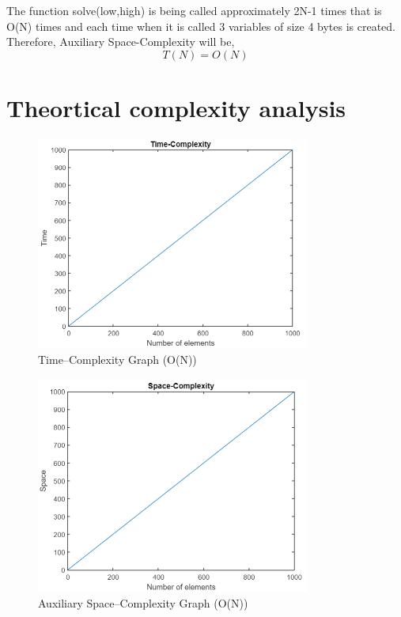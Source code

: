 \documentclass[conference]{IEEEtran}
\begin{document}
The function solve(low,high) is being called approximately 2N-1 times that is O(N) times and each time when it is called 3 variables of size 4 bytes is created.
Therefore, Auxiliary Space-Complexity will be,
\begin{equation}
    T(N) = O(N)
\end{equation}
\section{Theortical complexity analysis}
\begin{figure}[htbp]
\centerline{\includegraphics[width=9cm]{Time.png}}
\caption{Time–Complexity Graph (O(N))}
\label{fig}
\end{figure}
\begin{figure}[htbp]
\centerline{\includegraphics[width=9cm]{Space.png}}
\caption{Auxiliary Space–Complexity Graph (O(N))}
\label{fig}
\end{figure}
\end{document}
